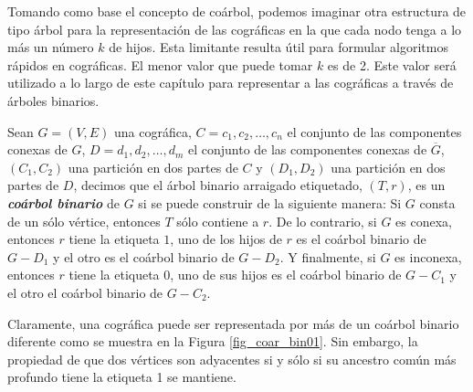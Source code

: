 Tomando como base el concepto de coárbol, podemos imaginar otra estructura de tipo árbol para la representación de las cográficas en la que cada nodo tenga a lo más un número $k$ de hijos. Esta limitante resulta útil para formular algoritmos rápidos en cográficas. El menor valor que puede tomar $k$ es de 2. Este valor será utilizado a lo largo de este capítulo para representar a las cográficas a través de árboles binarios.


\begin{definition}{}

    Sean $G=(V,E)$ una cográfica, $C = c_1, c_2, \dots, c_n$ el conjunto de las componentes conexas de $G$, $D = {d_1, d_2, \dots, d_m}$ el conjunto de las componentes conexas de $\overline{G}$, $(C_1, C_2)$ una partición en dos partes de $C$ y $(D_1, D_2)$ una partición en dos partes de $D$, decimos que el árbol binario arraigado etiquetado, $(T,r)$, es un \textbf{\emph{coárbol binario}} de $G$ si se puede construir de la siguiente manera: Si $G$ consta de un sólo vértice, entonces $T$ sólo contiene a $r$. De lo contrario, si $G$ es conexa, entonces $r$ tiene la etiqueta $1$, uno de los hijos de $r$ es el coárbol binario de $G-D_1$ y el otro es el coárbol binario de $G-D_2$. Y finalmente, si $G$ es inconexa, entonces $r$ tiene la etiqueta $0$, uno de sus hijos es el coárbol binario de $G-C_1$ y el otro el coárbol binario de $G-C_2$.


\end{definition}

Claramente, una cográfica puede ser representada por más de un coárbol binario diferente como se muestra en la Figura \ref{fig_coar_bin01}. Sin embargo, la propiedad de que dos vértices son adyacentes si y sólo si su ancestro común más profundo tiene la etiqueta 1 se mantiene.

